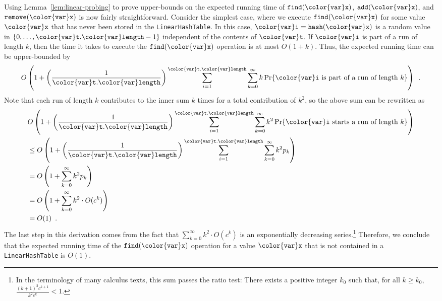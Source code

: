 \documentclass[10pt]{book}
\theoremstyle{plain}
\newcommand{\lemref}[1]{Lemma~\ref{lem:#1}}
\theoremstyle{definition}
\begin{document}
Using \lemref{linear-probing} to prove upper-bounds on the expected
running time of \ensuremath{\mathtt{find({\color{var}x})}}, \ensuremath{\mathtt{add({\color{var}x})}}, and \ensuremath{\mathtt{remove({\color{var}x})}} is now fairly
straightforward.  Consider the simplest case, where we execute
\ensuremath{\mathtt{find({\color{var}x})}} for some value \ensuremath{\mathtt{{\color{var}x}}} that has never been stored in the
\texttt{LinearHashTable}.  In this case, $\ensuremath{\mathtt{{\color{var}i}}}=\ensuremath{\mathtt{hash({\color{var}x})}}$ is a random value in
$\{0,\ldots,\ensuremath{\mathtt{{\color{var}t}.{\color{var}length}}}-1\}$ independent of the contents of \ensuremath{\mathtt{{\color{var}t}}}.  If \ensuremath{\mathtt{{\color{var}i}}}
is part of a run of length $k$, then the time it takes to execute the
\ensuremath{\mathtt{find({\color{var}x})}} operation is at most $O(1+k)$.  Thus, the expected running time
can be upper-bounded by
\[
  O\left(1 + \left(\frac{1}{\ensuremath{\mathtt{{\color{var}t}.{\color{var}length}}}}\right)\sum_{i=1}^{\ensuremath{\mathtt{{\color{var}t}.{\color{var}length}}}}\sum_{k=0}^{\infty} k\Pr\{\text{\ensuremath{\mathtt{{\color{var}i}}} is part of a run of length $k$}\}\right) \enspace .
\]
Note that each run of length $k$ contributes to the inner sum $k$ times for a total contribution of $k^2$,  so the above sum can be rewritten as
\begin{align*}
  & { } O\left(1 + \left(\frac{1}{\ensuremath{\mathtt{{\color{var}t}.{\color{var}length}}}}\right)\sum_{i=1}^{\ensuremath{\mathtt{{\color{var}t}.{\color{var}length}}}}\sum_{k=0}^{\infty} k^2\Pr\{\mbox{\ensuremath{\mathtt{{\color{var}i}}} starts a run of length $k$}\}\right) \\
  & \le O\left(1 + \left(\frac{1}{\ensuremath{\mathtt{{\color{var}t}.{\color{var}length}}}}\right)\sum_{i=1}^{\ensuremath{\mathtt{{\color{var}t}.{\color{var}length}}}}\sum_{k=0}^{\infty} k^2p_k\right) \\
  & = O\left(1 + \sum_{k=0}^{\infty} k^2p_k\right) \\
  & = O\left(1 + \sum_{k=0}^{\infty} k^2\cdot O(c^k)\right) \\
  & = O(1) \enspace .
\end{align*}
The last step in this derivation comes from the fact that
$\sum_{k=0}^{\infty} k^2\cdot O(c^k)$ is an exponentially decreasing
series.\footnote{In the terminology of many calculus texts, this sum
passes the ratio test:  There exists a positive integer $k_0$ such
that, for all $k\ge k_0$, $\frac{(k+1)^2c^{k+1}}{k^2c^k} < 1$.}
Therefore, we conclude that the expected running time of the \ensuremath{\mathtt{find({\color{var}x})}} operation
for a value \ensuremath{\mathtt{{\color{var}x}}} that is not contained in a \texttt{LinearHashTable} is $O(1)$.
\end{document}
